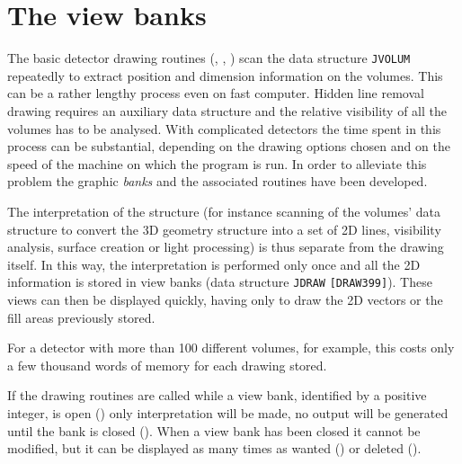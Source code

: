                    
                    
\section{The view banks}
The basic detector drawing routines (, , 
) scan the data structure {\tt JVOLUM} repeatedly to
extract position and dimension information on the volumes. This can
be a rather lengthy process even on fast computer. 
Hidden line removal drawing requires
an auxiliary data structure and the 
relative visibility of all the volumes has to be analysed. With complicated 
detectors the time spent in this process can be substantial, depending 
on the drawing options chosen and on the speed of the machine on which 
the program is run. In order to alleviate this problem the graphic
{\it banks} and the associated routines have been developed.

The interpretation
of the structure (for instance scanning of the volumes' data structure 
to convert the 3D geometry structure into a set 
of 2D lines, visibility analysis, surface creation or
light processing) is thus separate
from the drawing itself. In this way, the interpretation is performed 
only once and all the 2D information is stored in view banks (data 
structure {\tt JDRAW} {\tt [DRAW399]}). These views can then be displayed
quickly, having only to draw the 2D vectors or the fill
areas previously stored. 

For a detector with more than 100 different volumes, for example, 
this costs only a few thousand words of memory for 
each drawing stored.

If the drawing routines are called while a view bank, identified by
a positive integer, is open ()
only interpretation will be made,
no output will be generated until the bank is closed ().
When a view bank has been closed it cannot be modified, but
it can be displayed as many times as wanted () or deleted
().

